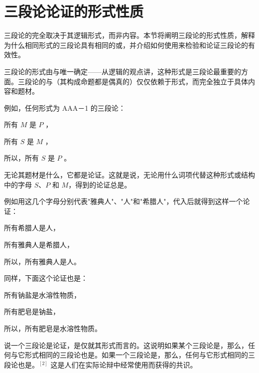 \section{三段论论证的形式性质}

\begin{logicbox}[title=引言]
三段论的完全取决于其逻辑形式，而非内容。本节将阐明三段论的形式性质，解释为什么相同形式的三段论具有相同的或，并介绍如何使用来检验和论证三段论的有效性。
\end{logicbox}

\begin{theorembox}[title=三段论的形式性质]
三段论的形式由与唯一确定——从逻辑的观点讲，这种形式是三段论最重要的方面。三段论的与（其构成命题都是偶真的）仅仅依赖于形式，而完全独立于具体内容和题材。
\end{theorembox}

例如，任何形式为 AAA－1 的三段论：

\begin{examplebox}[title=AAA-1形式的三段论]
所有 $M$ 是 $P$ ，

所有 $S$ 是 $M$ ，

所以，所有 $S$ 是 $P$ 。

无论其题材是什么，它都是论证。这就是说，无论用什么词项代替这种形式或结构中的字母 $S$、$P$ 和 $M$，得到的论证总是。
\end{examplebox}

例如用这几个字母分别代表"雅典人"、"人"和"希腊人"，代入后就得到这样一个论证：

所有希腊人是人，

所有雅典人是希腊人，

所以，所有雅典人是人。

同样，下面这个论证也是：

所有钠盐是水溶性物质，

所有肥皂是钠盐，

所以，所有肥皂是水溶性物质。

说一个三段论是论证，是仅就其形式而言的。这说明如果某个三段论是，那么，任何与它形式相同的三段论也是。如果一个三段论是，那么，任何与它形式相同的三段论也是。$^{[2]}$ 这是人们在实际论辩中经常使用而获得的共识。

